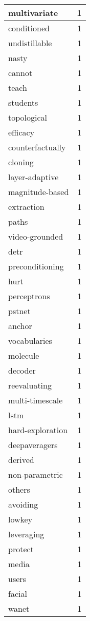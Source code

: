 \begin{table}[h]
\begin{tabular}{|l|r|}
\hline
multivariate & 1 \\
\hline
conditioned & 1 \\
\hline
undistillable & 1 \\
\hline
nasty & 1 \\
\hline
cannot & 1 \\
\hline
teach & 1 \\
\hline
students & 1 \\
\hline
topological & 1 \\
\hline
efficacy & 1 \\
\hline
counterfactually & 1 \\
\hline
cloning & 1 \\
\hline
layer-adaptive & 1 \\
\hline
magnitude-based & 1 \\
\hline
extraction & 1 \\
\hline
paths & 1 \\
\hline
video-grounded & 1 \\
\hline
detr & 1 \\
\hline
preconditioning & 1 \\
\hline
hurt & 1 \\
\hline
perceptrons & 1 \\
\hline
pstnet & 1 \\
\hline
anchor & 1 \\
\hline
vocabularies & 1 \\
\hline
molecule & 1 \\
\hline
decoder & 1 \\
\hline
reevaluating & 1 \\
\hline
multi-timescale & 1 \\
\hline
lstm & 1 \\
\hline
hard-exploration & 1 \\
\hline
deepaveragers & 1 \\
\hline
derived & 1 \\
\hline
non-parametric & 1 \\
\hline
others & 1 \\
\hline
avoiding & 1 \\
\hline
lowkey & 1 \\
\hline
leveraging & 1 \\
\hline
protect & 1 \\
\hline
media & 1 \\
\hline
users & 1 \\
\hline
facial & 1 \\
\hline
wanet & 1 \\

\end{tabular}
\end{table}
